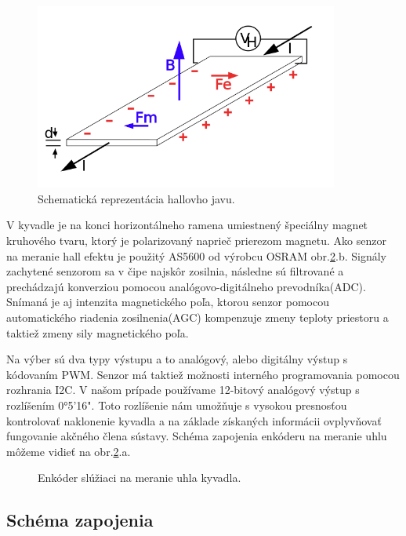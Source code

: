 \begin{figure}[!tbh]
	\centering
	\includegraphics[width=100mm]{obr/hallovjav.png}
	\caption{Schematická reprezentácia hallovho javu.}\label{OBRAZOK 1.323}
\end{figure}

V kyvadle je na konci horizontálneho ramena umiestnený špeciálny magnet kruhového tvaru, ktorý je polarizovaný naprieč prierezom magnetu. Ako senzor na meranie hall efektu je použitý AS5600 od výrobcu OSRAM obr.\ref{OBRAZOK 2.2}.b. Signály zachytené senzorom sa v čipe najskôr zosilnia, následne sú filtrované a prechádzajú konverziou pomocou analógovo-digitálneho prevodníka(ADC). Snímaná je aj intenzita magnetického poľa, ktorou senzor pomocou
automatického riadenia zosilnenia(AGC) kompenzuje zmeny teploty priestoru a taktiež zmeny sily magnetického poľa.

Na výber sú dva typy výstupu a to analógový, alebo digitálny výstup s kódovaním PWM. Senzor má taktiež možnosti interného programovania pomocou rozhrania I2C.
V našom prípade používame 12-bitový analógový výstup s rozlíšením 0°5'16". Toto rozlíšenie nám umožňuje s vysokou presnosťou kontrolovať naklonenie kyvadla a na základe získaných informácii ovplyvňovať fungovanie akčného člena sústavy. Schéma zapojenia enkóderu na meranie uhlu môžeme vidieť na obr.\ref{OBRAZOK 2.2}.a.



\begin{figure}[!tbh]
	\hfill
	\hfill
	\hfill
	\caption{Enkóder slúžiaci na meranie uhla kyvadla.}\label{OBRAZOK 2.2}
\end{figure}

\newpage


\subsection{Schéma zapojenia}

